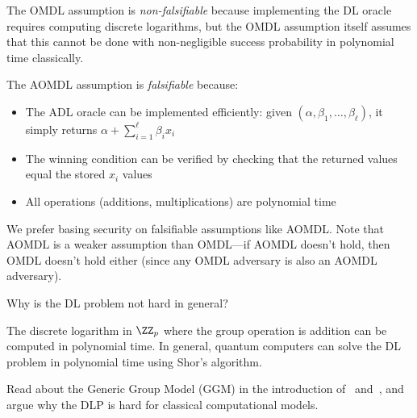\ifsolutions
\begin{mysolution}
  The OMDL assumption is \emph{non-falsifiable} because implementing the DL oracle requires computing discrete logarithms, but the OMDL assumption itself assumes that this cannot be done with non-negligible success probability in polynomial time classically.

  The AOMDL assumption is \emph{falsifiable} because:
  \begin{itemize}
    \item The ADL oracle can be implemented efficiently: given $(\alpha, \beta_1, \ldots, \beta_\ell)$, it simply returns $\alpha + \sum_{i=1}^\ell \beta_i x_i$
    \item The winning condition can be verified by checking that the returned values equal the stored $x_i$ values
    \item All operations (additions, multiplications) are polynomial time
  \end{itemize}

  We prefer basing security on falsifiable assumptions like AOMDL. Note that AOMDL is a weaker assumption than OMDL---if AOMDL doesn't hold, then OMDL doesn't hold either (since any OMDL adversary is also an AOMDL adversary).
\end{mysolution}
\fi

\begin{exercise}[Optional]
  Why is the DL problem not hard in general?
\end{exercise}

\ifsolutions
\begin{mysolution}
  The discrete logarithm in $\ZZ_p$ where the group operation is addition can be computed in polynomial time.
  In general, quantum computers can solve the DL problem in polynomial time using Shor's algorithm.
\end{mysolution}
\fi

\begin{exercise}[Optional]
  Read about the Generic Group Model (GGM) in the introduction of~\cite{EC:Shoup97} and~\cite{IMA:Maurer05}, and argue why the DLP is hard for classical computational models.
\end{exercise}

